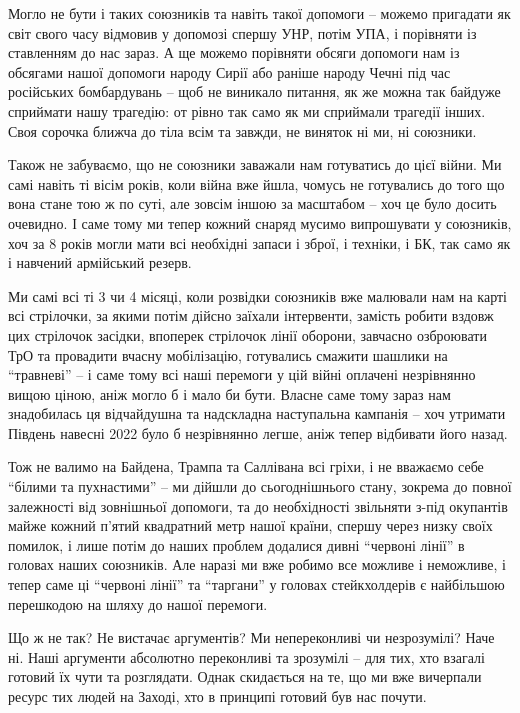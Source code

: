 Могло не бути і таких союзників та навіть такої допомоги – можемо пригадати як
світ свого часу відмовив у допомозі спершу УНР, потім УПА, і порівняти із
ставленням до нас зараз. А ще можемо порівняти обсяги допомоги нам із обсягами
нашої допомоги народу Сирії або раніше народу Чечні під час російських
бомбардувань – щоб не виникало питання, як же можна так байдуже сприймати нашу
трагедію: от рівно так само як ми сприймали трагедії інших. Своя сорочка ближча
до тіла всім та завжди, не виняток ні ми, ні союзники.

Також не забуваємо, що не союзники заважали нам готуватись до цієї війни. Ми
самі навіть ті вісім років, коли війна вже йшла, чомусь не готувались до того
що вона стане тою ж по суті, але зовсім іншою за масштабом – хоч це було досить
очевидно. І саме тому ми тепер кожний снаряд мусимо випрошувати у союзників,
хоч за 8 років могли мати всі необхідні запаси і зброї, і техніки, і БК, так
само як і навчений армійський резерв.

Ми самі всі ті 3 чи 4 місяці, коли розвідки союзників вже малювали нам на карті
всі стрілочки, за якими потім дійсно заїхали інтервенти, замість робити вздовж
цих стрілочок засідки, впоперек стрілочок лінії оборони, завчасно озброювати
ТрО та провадити вчасну мобілізацію, готувались смажити шашлики на \enquote{травневі} –
і саме тому всі наші перемоги у цій війні оплачені незрівнянно вищою ціною,
аніж могло б і мало би бути. Власне саме тому зараз нам знадобилась ця
відчайдушна та надскладна наступальна кампанія – хоч утримати Південь навесні
2022 було б незрівнянно легше, аніж тепер відбивати його назад.

Тож не валимо на Байдена, Трампа та Саллівана всі гріхи, і не вважаємо себе
\enquote{білими та пухнастими} – ми дійшли до сьогоднішнього стану, зокрема до повної
залежності від зовнішньої допомоги, та до необхідності звільняти з-під
окупантів майже кожний п’ятий квадратний метр нашої країни, спершу через низку
своїх помилок, і лише потім до наших проблем додалися дивні \enquote{червоні лінії} в
головах наших союзників. Але наразі ми вже робимо все можливе і неможливе, і
тепер саме ці \enquote{червоні лінії} та \enquote{таргани} у головах стейкхолдерів є найбільшою
перешкодою на шляху до нашої перемоги.

Що ж не так? Не вистачає аргументів? Ми непереконливі чи незрозумілі? Наче ні.
Наші аргументи абсолютно переконливі та зрозумілі – для тих, хто взагалі
готовий їх чути та розглядати. Однак скидається на те, що ми вже вичерпали
ресурс тих людей на Заході, хто в принципі готовий був нас почути.

